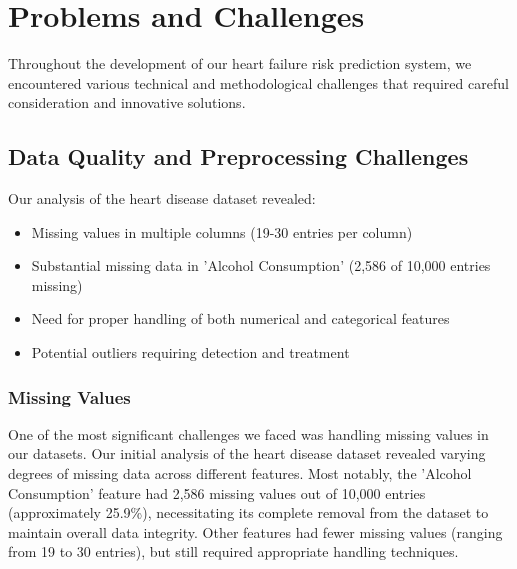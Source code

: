 \documentclass[11pt,a4paper]{article}
\begin{document}
\section{Problems and Challenges}

Throughout the development of our heart failure risk prediction system, we encountered various technical and methodological challenges that required careful consideration and innovative solutions.

\subsection{Data Quality and Preprocessing Challenges}

\begin{tcolorbox}[
        title=Data Quality Issues Overview,
        colback=lightpurple!30,
        colframe=mediumpurple,
        boxrule=0.5pt,
        fonttitle=\bfseries\sffamily\footnotesize,
        fontupper=\footnotesize
    ]
    Our analysis of the heart disease dataset revealed:
    \begin{itemize}[leftmargin=*, itemsep=2pt, parsep=0pt]
        \item Missing values in multiple columns (19-30 entries per column)
        \item Substantial missing data in 'Alcohol Consumption' (2,586 of 10,000 entries missing)
        \item Need for proper handling of both numerical and categorical features
        \item Potential outliers requiring detection and treatment
    \end{itemize}
\end{tcolorbox}





\subsubsection{Missing Values}
\vspace{-0.25cm}
One of the most significant challenges we faced was handling missing values in our datasets. Our initial analysis of the heart disease dataset revealed varying degrees of missing data across different features. Most notably, the 'Alcohol Consumption' feature had 2,586 missing values out of 10,000 entries (approximately 25.9\%), necessitating its complete removal from the dataset to maintain overall data integrity. Other features had fewer missing values (ranging from 19 to 30 entries), but still required appropriate handling techniques.
\end{document}
